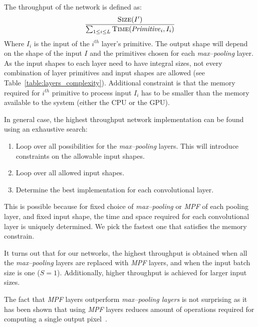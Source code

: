 \documentclass[conference]{./IEEEtran/IEEEtran}
\begin{document}
  The throughput of the network is defined as:
  \[
  \frac{\proc{Size}(I')}{\sum_{1 \le i \le L}
    \proc{Time}(\id{Primitive}_i,I_i)}
  \]
  Where $I_i$ is the input of the $i^{th}$ layer's primitive.  The
  output shape will depend on the shape of the input $I$ and the
  primitives chosen for each \emph{max--pooling} layer.  As the input
  shapes to each layer need to have integral sizes, not every
  combination of layer primitives and input shapes are allowed (see
  Table~\ref{table:layers_complexity}).  Additional constraint is that
  the memory required for $i^{th}$ primitive to process input $I_i$
  has to be smaller than the memory available to the system (either
  the CPU or the GPU).

  In general case, the highest throughput network implementation can
  be found using an exhaustive search:

  \begin{enumerate}
    \item Loop over all possibilities for the \emph{max--pooling}
      layers.  This will introduce constraints on the allowable input
      shapes.
    \item Loop over all allowed input shapes.
    \item Determine the best implementation for each convolutional
      layer.
  \end{enumerate}

  This is possible because for fixed choice of \emph{max--pooling} or
  \emph{MPF} of each pooling layer, and fixed input shape, the time
  and space required for each convolutional layer is uniquely
  determined.  We pick the fastest one that satisfies the memory
  constrain.

  It turns out that for our networks, the highest throughput is
  obtained when all the \emph{max--pooling} layers are replaced with
  \emph{MPF} layers, and when the input batch size is one ($S = 1$).
  Additionally, higher throughput is achieved for larger input sizes.

  The fact that \emph{MPF} layers outperform \emph{max--pooling
    layers} is not surprising as it has been shown that
    using \emph{MPF} layers reduces amount of operations required for
    computing a single output
    pixel~\cite{giusti2013fast,masci2013fast}.
\end{document}
